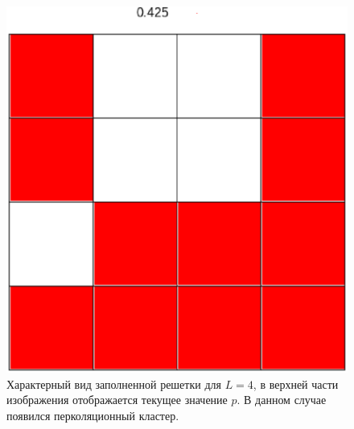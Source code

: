 \documentclass[14pt,a4paper,report]{ncc}
\begin{document}
\begin{figure}[h!]
\begin{center}
\begin{minipage}[h!]{0.45\linewidth}
\includegraphics[width=1\linewidth]{L4_2}
\caption{Характерный вид заполненной решетки для $L=4$, в верхней части изображения отображается текущее значение $p$. В данном случае появился перколяционный кластер.}
\label{ris:experimcoded}
\end{minipage}
\end{center}
\end{figure}
\end{document}
